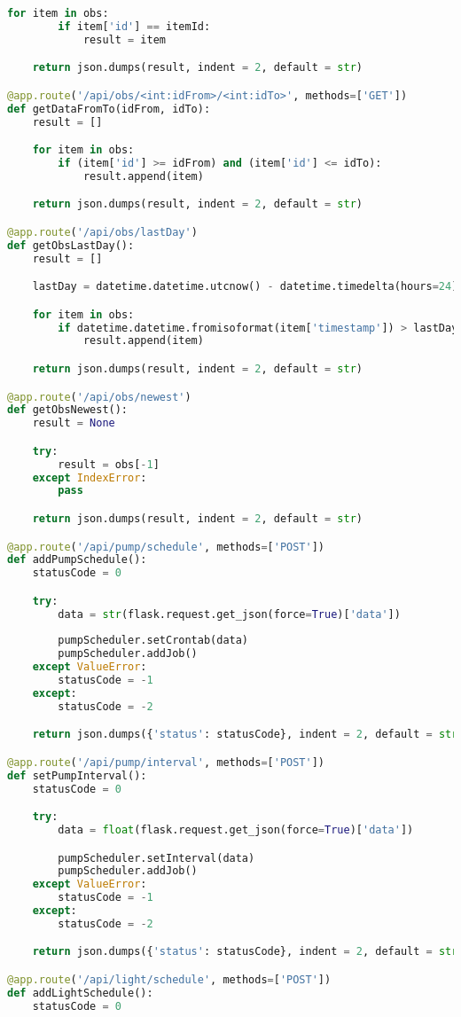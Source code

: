 \documentclass[12pt,a4paper,oneside]{book}
\begin{document}
\begin{lstlisting}[title={raspberrypi/api/data.py}, language=Python]
    for item in obs:
        if item['id'] == itemId:
            result = item

    return json.dumps(result, indent = 2, default = str)

@app.route('/api/obs/<int:idFrom>/<int:idTo>', methods=['GET'])
def getDataFromTo(idFrom, idTo):
    result = []

    for item in obs:
        if (item['id'] >= idFrom) and (item['id'] <= idTo):
            result.append(item)

    return json.dumps(result, indent = 2, default = str)

@app.route('/api/obs/lastDay')
def getObsLastDay():
    result = []

    lastDay = datetime.datetime.utcnow() - datetime.timedelta(hours=24)

    for item in obs:
        if datetime.datetime.fromisoformat(item['timestamp']) > lastDay:
            result.append(item)

    return json.dumps(result, indent = 2, default = str)

@app.route('/api/obs/newest')
def getObsNewest():
    result = None

    try:
        result = obs[-1]
    except IndexError:
        pass

    return json.dumps(result, indent = 2, default = str)

@app.route('/api/pump/schedule', methods=['POST'])
def addPumpSchedule():
    statusCode = 0

    try:
        data = str(flask.request.get_json(force=True)['data'])
        
        pumpScheduler.setCrontab(data)
        pumpScheduler.addJob()
    except ValueError:
        statusCode = -1
    except:
        statusCode = -2

    return json.dumps({'status': statusCode}, indent = 2, default = str)

@app.route('/api/pump/interval', methods=['POST'])
def setPumpInterval():
    statusCode = 0

    try:
        data = float(flask.request.get_json(force=True)['data'])

        pumpScheduler.setInterval(data)
        pumpScheduler.addJob()
    except ValueError:
        statusCode = -1
    except:
        statusCode = -2

    return json.dumps({'status': statusCode}, indent = 2, default = str)

@app.route('/api/light/schedule', methods=['POST'])
def addLightSchedule():
    statusCode = 0


\end{lstlisting}
\end{document}
